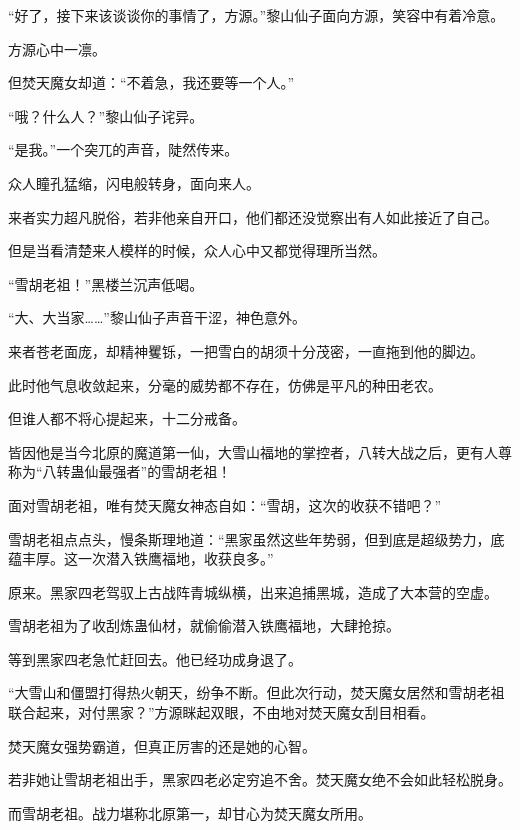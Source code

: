 
\begin{this_body}



“好了，接下来该谈谈你的事情了，方源。”黎山仙子面向方源，笑容中有着冷意。

方源心中一凛。

但焚天魔女却道：“不着急，我还要等一个人。”

“哦？什么人？”黎山仙子诧异。

“是我。”一个突兀的声音，陡然传来。

众人瞳孔猛缩，闪电般转身，面向来人。

来者实力超凡脱俗，若非他亲自开口，他们都还没觉察出有人如此接近了自己。

但是当看清楚来人模样的时候，众人心中又都觉得理所当然。

“雪胡老祖！”黑楼兰沉声低喝。

“大、大当家……”黎山仙子声音干涩，神色意外。

来者苍老面庞，却精神矍铄，一把雪白的胡须十分茂密，一直拖到他的脚边。

此时他气息收敛起来，分毫的威势都不存在，仿佛是平凡的种田老农。

但谁人都不将心提起来，十二分戒备。

皆因他是当今北原的魔道第一仙，大雪山福地的掌控者，八转大战之后，更有人尊称为“八转蛊仙最强者”的雪胡老祖！

面对雪胡老祖，唯有焚天魔女神态自如：“雪胡，这次的收获不错吧？”

雪胡老祖点点头，慢条斯理地道：“黑家虽然这些年势弱，但到底是超级势力，底蕴丰厚。这一次潜入铁鹰福地，收获良多。”

原来。黑家四老驾驭上古战阵青城纵横，出来追捕黑城，造成了大本营的空虚。

雪胡老祖为了收刮炼蛊仙材，就偷偷潜入铁鹰福地，大肆抢掠。

等到黑家四老急忙赶回去。他已经功成身退了。

“大雪山和僵盟打得热火朝天，纷争不断。但此次行动，焚天魔女居然和雪胡老祖联合起来，对付黑家？”方源眯起双眼，不由地对焚天魔女刮目相看。

焚天魔女强势霸道，但真正厉害的还是她的心智。

若非她让雪胡老祖出手，黑家四老必定穷追不舍。焚天魔女绝不会如此轻松脱身。

而雪胡老祖。战力堪称北原第一，却甘心为焚天魔女所用。


\end{this_body}
